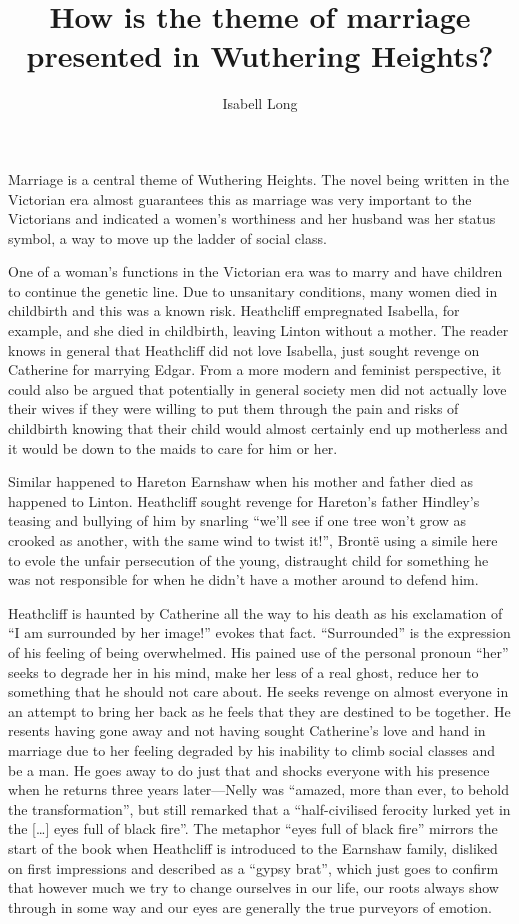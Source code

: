 \documentclass[a4paper]{article}
\begin{document}
\title{How is the theme of marriage presented in Wuthering Heights?}
\author{Isabell Long}
\maketitle

Marriage is a central theme of Wuthering Heights. The novel being written in the Victorian era almost guarantees this as marriage was very important to the Victorians and indicated a women's worthiness and her husband was her status symbol, a way to move up the ladder of social class.

One of a woman's functions in the Victorian era was to marry and have children to continue the genetic line. Due to unsanitary conditions, many women died in childbirth and this was a known risk. Heathcliff empregnated Isabella, for example, and she died in childbirth, leaving Linton without a mother. The reader knows in general that Heathcliff did not love Isabella, just sought revenge on Catherine for marrying Edgar. From a more modern and feminist perspective, it could also be argued that potentially in general society men did not actually love their wives if they were willing to put them through the pain and risks of childbirth knowing that their child would almost certainly end up motherless and it would be down to the maids to care for him or her.

Similar happened to Hareton Earnshaw when his mother and father died as happened to Linton. Heathcliff sought revenge for Hareton's father Hindley's teasing and bullying of him by snarling ``we'll see if one tree won't grow as crooked as another, with the same wind to twist it!'', Bront\"{e} using a simile here to evole the unfair persecution of the young, distraught child for something he was not responsible for when he didn't have a mother around to defend him.

Heathcliff is haunted by Catherine all the way to his death as his exclamation of ``I am surrounded by her image!'' evokes that fact. ``Surrounded'' is the expression of his feeling of being overwhelmed. His pained use of the personal pronoun ``her'' seeks to degrade her in his mind, make her less of a real ghost, reduce her to something that he should not care about. He seeks revenge on almost everyone in an attempt to bring her back as he feels that they are destined to be together. He resents having gone away and not having sought Catherine's love and hand in marriage due to her feeling degraded by his inability to climb social classes and be a man. He goes away to do just that and shocks everyone with his presence when he returns three years later---Nelly was ``amazed, more than ever, to behold the transformation'', but still remarked that a ``half-civilised ferocity lurked yet in the [\ldots] eyes full of black fire''. The metaphor ``eyes full of black fire'' mirrors the start of the book when Heathcliff is introduced to the Earnshaw family, disliked on first impressions and described as a ``gypsy brat'', which just goes to confirm that however much we try to change ourselves in our life, our roots always show through in some way and our eyes are generally the true purveyors of emotion.
\end{document}
